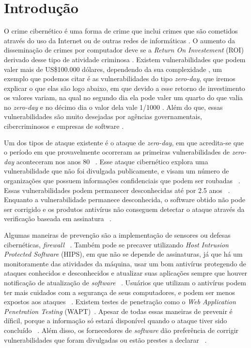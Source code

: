 \section{Introdução}
O crime cibernético é uma forma de crime que inclui crimes que são cometidos através do uso da Internet ou de outras redes de
informáticas \cite{Fotiet:2015}. O aumento da disseminação de crimes por computador deve se a \textit{Return On Investement}
(ROI) derivado desse tipo de atividade criminosa \cite{Fotiet:2015}. Existem vulnerabilidades que podem valer mais de US\$100.000 
dólares, dependendo da sua complexidade \cite{Bilge:2012}, um exemplo que podemos citar é as vulnerabilidades do tipo \textit{zero-day}, 
que iremos explicar o que elas são logo abaixo, em que devido a esse retorno de investimento os valores variam, na qual no segundo dia 
ela pode valer um quarto do que valia no \textit{zero-day} e no décimo dia o valor dela vale 1/1000 \cite{Fotiet:2015}. Além do que, 
essas vulnerabilidades são muito desejadas por agências governamentais, cibercriminosos e empresas de software \cite{Kumar:2016}.

Um dos tipos de ataque existente é o ataque de \textit{zero-day}, em que acredita-se que o período em que provavelmente ocorreram as 
primeiras vulnerabilidades de \textit{zero-day} aconteceram nos anos 80 ~\cite{Fotiet:2015}. Esse ataque cibernético explora uma 
vulnerabilidade que não foi divulgada publicamente, e visam um número de organizações que possuem informações confidenciais 
que podem ser roubadas ~\cite{Bilge:2012}. Essas vulnerabilidades podem permanecer desconhecidas até por 2.5 anos ~\cite{Bilge:2012}. 
Enquanto a vulnerabilidade permanece desconhecida, o software obtido não pode ser corrigido e os produtos antivírus não conseguem 
detectar o ataque através da verificação baseada em assinatura ~\cite{Bilge:2012}. 

Algumas maneiras de prevenção são a implementação de sensores ou defesas cibernéticas, \textit{firewall} ~\cite{Last:2016}. Também pode 
se precaver utilizando \textit{Host Intrusion Protected Software} (HIPS), em que não se depende de assinaturas, já que há um 
monitoramente das atividades da máquina, usar um bom antivírus protegendo de ataques conhecidos e desconhecidos e atualizar suas 
aplicações sempre que houver notificação de atualização de \textit{software} ~\cite{Kumar:2016}. Usuários que utilizam o antivírus podem 
ter mais cuidados com a segurança de seus computadores, e podem ser menos expostos aos ataques ~\cite{Bilge:2012}. Existem testes de 
penetração como o \textit{Web Application Penetration Testing} (WAPT)~\cite{Kumar:2016}. Apesar de todas essas maneiras de prevenir é 
díficil, porque a informação só estará disponível quando o ataque tiver sido concluído ~\cite{Kumar:2016}. Além disso, os fornecedores 
de \textit{software} dão preferência de corrigir vulnerabilidades que foram divulgadas ou estão prestes a declarar ~\cite{Bilge:2012}.

